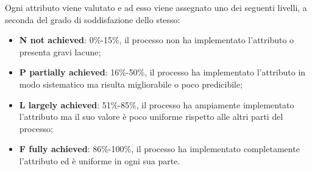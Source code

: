 Ogni attributo viene valutato e ad esso viene assegnato uno dei seguenti livelli, a seconda del grado di soddisfazione dello stesso:
\begin{itemize}
	\item \textbf{N not achieved}: 0\%-15\%, il processo non ha implementato l'attributo o presenta gravi lacune;
	\item \textbf{P partially achieved}: 16\%-50\%, il processo ha implementato l'attributo in modo sistematico ma risulta migliorabile o poco predicibile;
	\item \textbf{L largely achieved}: 51\%-85\%, il processo ha ampiamente implementato l'attributo ma il suo valore è poco uniforme rispetto alle altri parti del processo;
	\item \textbf{F fully achieved}: 86\%-100\%, il processo ha implementato completamente l'attributo ed è uniforme in ogni sua parte.
\end{itemize}

\newpage

